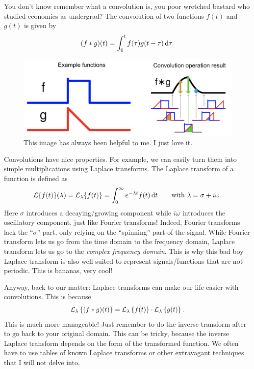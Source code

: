 \documentclass[12pt]{report}
\begin{document}
\begin{revise}
	You don't know remember what a convolution is, you poor wretched bastard who studied economics as undergrad? The convolution of two functions $f(t)$ and $g(t)$ is given by
	\begin{equation*}
		(f\ast g)(t)=\int_{0}^{t}f(\tau)g(t-\tau)\mathop{}\!\mathrm{d}\tau.
	\end{equation*}
\begin{figure}[H]
	\centering
	\includegraphics[width=0.5\linewidth]{img/screenshot027}
	\caption{This image has always been helpful to me. I just love it.}
	\label{fig:screenshot027}
\end{figure}
Convolutions have nice properties. For example, we can easily turn them into simple multiplications using Laplace transforms. The Laplace transform of a function is defined as 
\begin{equation*}
	\mathcal{L}\{f(t)\}(\lambda)=\mathcal{L}_{\lambda}\{f(t)\}=\int_{0}^{\infty}e^{-\lambda t}f(t)\mathop{}\!\mathrm{d} t\qquad\text{with }\lambda=\sigma+i\omega.
\end{equation*}
Here $\sigma$ introduces a decaying/growing component while $i\omega$ introduces the oscillatory component, just like Fourier transforms! Indeed, Fourier transforms lack the ``$\sigma$'' part, only relying on the ``spinning'' part of the signal. While Fourier transform lets us go from the time domain to the frequency domain, Laplace transform lets us go to the \textit{complex frequency domain}. This is why this bad boy Laplace transform is also well suited to represent signals/functions that are not periodic. This is bananas, very cool!\par
Anyway, back to our matter: Laplace transforms can make our life easier with convolutions. This is because
\begin{equation*}
	\mathcal{L}_{\lambda}\left\{(f\ast g)(t)\right\}=\mathcal{L}_{\lambda}\left\{f(t)\right\}\cdot\mathcal{L}_{\lambda}\left\{g(t)\right\}.
\end{equation*}
This is much more manageable! Just remember to do the inverse transform after to go back to your original domain. This can be tricky, because the inverse Laplace transform depends on the form of the transformed function. We often have to use tables of known Laplace transforms or other extravagant techniques that I will not delve into.
\end{revise}
\end{document}
